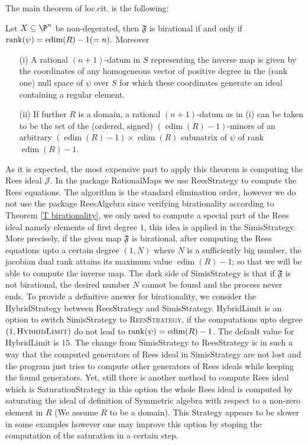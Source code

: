 \documentclass[12pt]{amsart}
\numberwithin{equation}{theorem}
\renewcommand{\:}{\colon}
\DeclareMathOperator{\edim}{edim}
\theoremstyle{theorem}
\begin{document}
The main theorem of loc.cit. is the following: 
\begin{theorem} \label{T birationality}Let $X\subseteq \P^n$ be non-degerated, then $\mathfrak{F}$ is birational if and only if ${\rm rank}(\psi)=\edim(R)-1(=n).$
Moreover
\begin{enumerate}
\item[{\rm (i)}] A rational $(n+1)$-datum in
$S$ representing the inverse map is given by the coordinates of any homogeneous vector of positive degree
in the {\rm (}rank one{\rm )} null space of $\psi$ over $S$ for which these coordinates generate an ideal containing
a regular element.

\item[{\rm (ii)}] If further $R$ is a domain, a rational $(n+1)$-datum as in {\rm (i)}
can be taken to be the set of the {\rm (}ordered, signed{\rm )} $(\edim(R)-1)$-minors
of an arbitrary $(\edim(R)-1)\times \edim(R)$ submatrix of $\psi$ of rank $\edim(R)-1$.
\end{enumerate}

\end{theorem}
As it is expected, the most expensive part to apply this theorem is computing the Rees ideal ${\mathcal J}$. In the package {\textsc RationalMaps} we use {\textsc ReesStrategy} to compute the Rees equations. The algorithm is the standard elimination order, however we do not use the package {\textsc ReesAlgebra} since verifying birationality according to Theorem \ref{T birationality}, we only need to compute a special part of the Rees ideal namely elements of first degree $1$, this idea is applied in the {\textsc SimisStrategy}. More precisely, if the given map $\mathfrak{F}$ is birational, after computing the Rees equations upto a certain degree $(1,N)$ where $N$ is a sufficiently big number, the jacobian dual rank attains its maximum value $\edim(R)-1$; so that we will be able to compute the inverse map.  The dark side of {\textsc SimisStrategy} is that if $\mathfrak{F}$ is not birational,  the desired number $N$ cannot be found and the process never ends. To provide a definitive answer for birationality,  we consider the {\textsc HybridStrategy}  between {\textsc ReesStrategy} and {\textsc SimisStrategy}. {\textsc HybridLimit} is an option to switch   {\textsc SimisStrategy} to  \textsc{ReesStrategy}, if the computations upto degree $(1, \textsc{HybridLimit})$ do not lead to   ${\rm rank}(\psi)=\edim(R)-1$. 
The default value for {\textsc HybridLimit} is $15$. The change from  {\textsc SimisStrategy} to  {\textsc ReesStrategy} is in such a way that the computed  generators of   Rees ideal  in { \textsc SimisStrategy} are not lost and the program just tries to compute other generators of Rees ideals while keeping the found generators.  Yet, still there is another method to compute Rees ideal which is {\textsc SaturationStrategy} in this option the whole Rees ideal is computed by saturating the  ideal of definition of Symmetric algebra with respect to a non-zero element in $R$ (We assume $R$ to be a domain). This Strategy appears to be slower in some examples however one may improve this option by stoping the computation of the saturation in a certain step.
\end{document}
